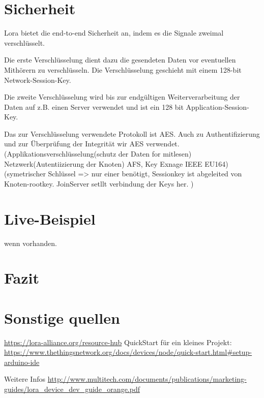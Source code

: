\documentclass[a4paper,12pt]{article}
\begin{document}
    \section{Sicherheit} \label{sec:Sicherheit}
        Lora bietet die end-to-end Sicherheit an, indem es die Signale zweimal verschlüsselt.

        Die erste Verschlüsselung dient dazu die gesendeten Daten vor eventuellen Mithörern zu verschlüsseln. Die Verschlüsselung geschieht mit einem 128-bit Network-Session-Key.

        Die zweite Verschlüsselung wird bis zur endgültigen Weiterverarbeitung der Daten auf z.B. einen Server verwendet und ist ein 128 bit Application-Session-Key.

        Das zur Verschlüsselung verwendete Protokoll ist AES. Auch zu Authentifizierung und zur Überprüfung der Integrität wir AES verwendet.
        \cite{LoRaSecur}
            \cite{WhatIsLoRa}(Applikationsverschlüsselung(schutz der Daten for mitlesen) Netzwerk(Autentiizierung der Knoten) AFS, Key Exnage IEEE EU164)
            \cite{LoRaSpec}(symetrischer Schlüssel => nur einer benötigt, Sessionkey ist abgeleited von Knoten-rootkey. JoinServer setllt verbindung der Keys her.
            )
    \section{Live-Beispiel}
        wenn vorhanden.

    \section{Fazit}
    \section{Sonstige quellen}
        \url{https://lora-alliance.org/resource-hub}
        QuickStart für ein kleines Projekt: \url{https://www.thethingsnetwork.org/docs/devices/node/quick-start.html#setup-arduino-ide}

        Weitere Infos \url{http://www.multitech.com/documents/publications/marketing-guides/lora_device_dev_guide_orange.pdf}
        \newpage
    
    
\end{document}
